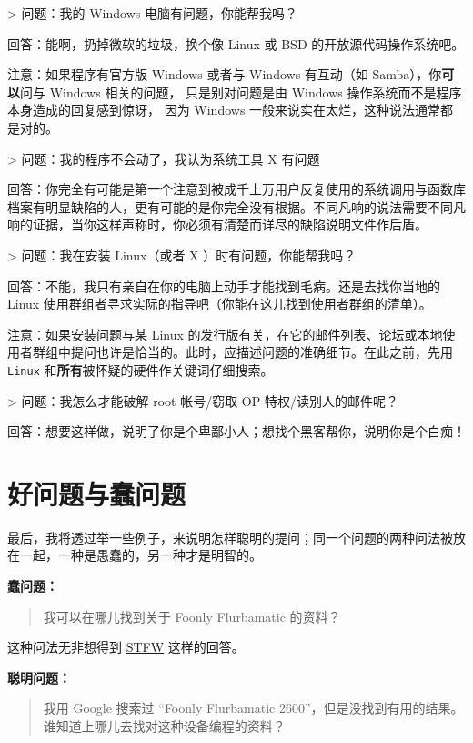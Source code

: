 \documentclass[titlepage]{article}
\begin{document}
 \textgreater{} 问题：我的 Windows 电脑有问题，你能帮我吗？

回答：能啊，扔掉微软的垃圾，换个像 Linux 或 BSD 的开放源代码操作系统吧。

注意：如果程序有官方版 Windows 或者与 Windows 有互动（如
Samba），你\textbf{可以}问与 Windows 相关的问题， 只是别对问题是由
Windows 操作系统而不是程序本身造成的回复感到惊讶， 因为 Windows
一般来说实在太烂，这种说法通常都是对的。

 \textgreater{} 问题：我的程序不会动了，我认为系统工具 X 有问题

回答：你完全有可能是第一个注意到被成千上万用户反复使用的系统调用与函数库档案有明显缺陷的人，更有可能的是你完全没有根据。不同凡响的说法需要不同凡响的证据，当你这样声称时，你必须有清楚而详尽的缺陷说明文件作后盾。

 \textgreater{} 问题：我在安装 Linux（或者 X ）时有问题，你能帮我吗？

回答：不能，我只有亲自在你的电脑上动手才能找到毛病。还是去找你当地的
Linux
使用群组者寻求实际的指导吧（你能在\href{http://www.linux.org/groups/index.html}{这儿}找到使用者群组的清单）。

注意：如果安装问题与某 Linux
的发行版有关，在它的邮件列表、论坛或本地使用者群组中提问也许是恰当的。此时，应描述问题的准确细节。在此之前，先用
\texttt{Linux} 和\textbf{所有}被怀疑的硬件作关键词仔细搜索。

 \textgreater{} 问题：我怎么才能破解 root 帐号/窃取 OP
特权/读别人的邮件呢？

回答：想要这样做，说明了你是个卑鄙小人；想找个黑客帮你，说明你是个白痴！

\hypertarget{ux597dux95eeux9898ux4e0eux8822ux95eeux9898}{\section{好问题与蠢问题}\label{ux597dux95eeux9898ux4e0eux8822ux95eeux9898}}

最后，我将透过举一些例子，来说明怎样聪明的提问；同一个问题的两种问法被放在一起，一种是愚蠢的，另一种才是明智的。

\textbf{蠢问题：}

\begin{quote}
我可以在哪儿找到关于 Foonly Flurbamatic 的资料？
\end{quote}

这种问法无非想得到 \protect\hyperlink{RTFM}{STFW} 这样的回答。

\textbf{聪明问题：}

\begin{quote}
我用 Google 搜索过 ``Foonly Flurbamatic
2600''，但是没找到有用的结果。谁知道上哪儿去找对这种设备编程的资料？
\end{quote}
\end{document}
